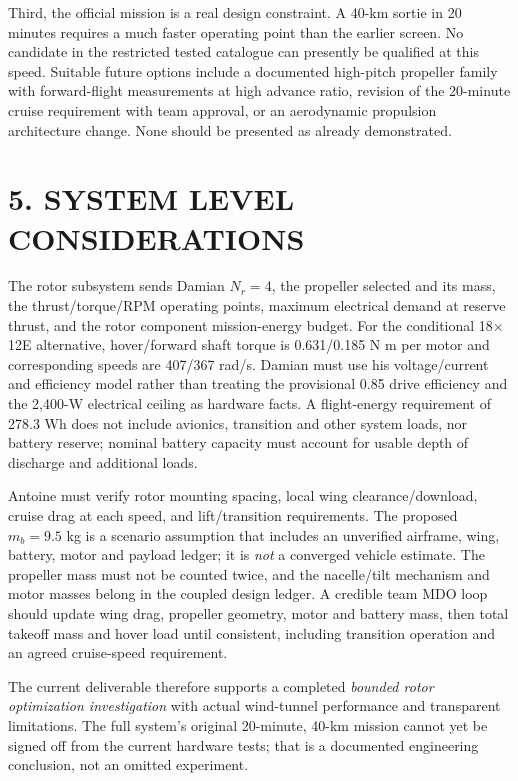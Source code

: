 \documentclass[12pt]{article}
\begin{document}
Third, the official mission is a real design constraint. A 40-km sortie in 20 minutes requires a much faster operating point than the earlier screen. No candidate in the restricted tested catalogue can presently be qualified at this speed. Suitable future options include a documented high-pitch propeller family with forward-flight measurements at high advance ratio, revision of the 20-minute cruise requirement with team approval, or an aerodynamic propulsion architecture change. None should be presented as already demonstrated.

\section*{5. SYSTEM LEVEL CONSIDERATIONS}
The rotor subsystem sends Damian $N_r=4$, the propeller selected and its mass, the thrust/torque/RPM operating points, maximum electrical demand at reserve thrust, and the rotor component mission-energy budget. For the conditional 18$\times$12E alternative, hover/forward shaft torque is 0.631/0.185 N m per motor and corresponding speeds are 407/367 rad/s. Damian must use his voltage/current and efficiency model rather than treating the provisional 0.85 drive efficiency and the 2,400-W electrical ceiling as hardware facts. A flight-energy requirement of 278.3 Wh does not include avionics, transition and other system loads, nor battery reserve; nominal battery capacity must account for usable depth of discharge and additional loads.

Antoine must verify rotor mounting spacing, local wing clearance/download, cruise drag at each speed, and lift/transition requirements. The proposed $m_b=9.5$ kg is a scenario assumption that includes an unverified airframe, wing, battery, motor and payload ledger; it is \emph{not} a converged vehicle estimate. The propeller mass must not be counted twice, and the nacelle/tilt mechanism and motor masses belong in the coupled design ledger. A credible team MDO loop should update wing drag, propeller geometry, motor and battery mass, then total takeoff mass and hover load until consistent, including transition operation and an agreed cruise-speed requirement.

The current deliverable therefore supports a completed \emph{bounded rotor optimization investigation} with actual wind-tunnel performance and transparent limitations. The full system's original 20-minute, 40-km mission cannot yet be signed off from the current hardware tests; that is a documented engineering conclusion, not an omitted experiment.
\end{document}
